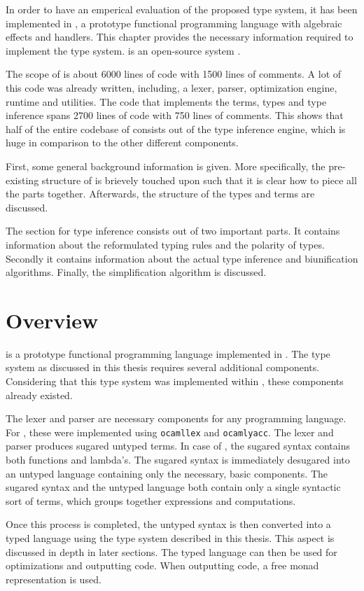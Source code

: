 In order to have an emperical evaluation of the proposed type system, it has been implemented in \eff, a prototype functional programming language with algebraic effects and handlers. This chapter provides the necessary information required to implement the type system. \eff is an open-source system \cite{eff-source}.

The scope of \eff is about 6000 lines of code with 1500 lines of comments. A lot of this code was already written, including, a lexer, parser, optimization engine, runtime and utilities. The code that implements the terms, types and type inference spans 2700 lines of code with 750 lines of comments. This shows that half of the entire codebase of \eff consists out of the type inference engine, which is huge in comparison to the other different components.

First, some general background information is given. More specifically, the pre-existing structure of \eff is brievely touched upon such that it is clear how to piece all the parts together. Afterwards, the structure of the types and terms are discussed. 

The section for type inference consists out of two important parts. It contains information about the reformulated typing rules and the polarity of types. Secondly it contains information about the actual type inference and biunification algorithms. Finally, the simplification algorithm is discussed.

\section{Overview}
\eff is a prototype functional programming language implemented in \ocaml. The type system as discussed in this thesis requires several additional components. Considering that this type system was implemented within \eff, these components already existed.

The lexer and parser are necessary components for any programming language. For \eff, these were implemented using \texttt{ocamllex} and \texttt{ocamlyacc}. The lexer and parser produces sugared untyped terms. In case of \eff, the sugared syntax contains both functions and lambda's. The sugared syntax is immediately desugared into an untyped language containing only the necessary, basic components. The sugared syntax and the untyped language both contain only a single syntactic sort of terms, which groups together expressions and computations. 

Once this process is completed, the untyped syntax is then converted into a typed language using the type system described in this thesis. This aspect is discussed in depth in later sections. The typed language can then be used for optimizations and outputting \ocaml code. When outputting \ocaml code, a free monad representation is used. \cite{programming, optimization}

